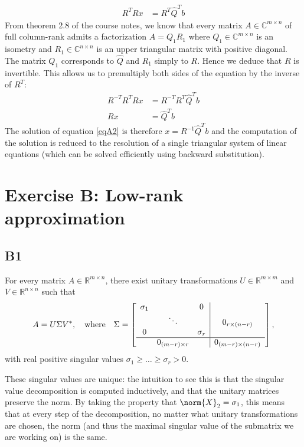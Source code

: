 \documentclass[11pt]{article}
\newcommand{\real}{\mathbb{R}} %
\newcommand{\complex}{\mathbb{C}} %
\newcommand{\snorm}[1]{\norm{#1}_2} %
\begin{document}
\begin{align*}
    R^TRx &= R^T\hat{Q}^Tb
\end{align*}
From theorem 2.8 of the course notes, we know that every matrix $A\in\complex^{m\times n}$ of full column-rank admits a factorization $A=Q_1R_1$ where $Q_1\in\complex^{m\times n}$ is an isometry and $R_1\in\complex^{n\times n}$ is an upper triangular matrix with positive diagonal. The matrix $Q_1$ corresponds to $\hat{Q}$ and $R_1$ simply to $R$. Hence we deduce that $R$ is invertible. This allows us to premultiply both sides of the equation by the inverse of $R^T$:
\begin{align*}
    R^{-T}R^TRx &= R^{-T}R^T\hat{Q}^Tb\\
    Rx &= \hat{Q}^Tb
\end{align*}
The solution of equation \eqref{eqA2} is therefore $x=R^{-1}\hat{Q}^Tb$ and the computation of the solution is reduced to the resolution of a single triangular system of linear equations (which can be solved efficiently using backward substitution).


\section*{Exercise B: Low-rank approximation}
\subsection*{B1}
For every matrix \(A \in \real^{m \times n}\), there exist unitary transformations \(U \in \real^{m \times m}\) and \(V \in \real^{n \times n}\) such that
\[
A = U \Sigma V^*, \quad \textnormal{where}\quad \Sigma = \left[\begin{array}{ccc|c}
\sigma_1 & & 0 & \\
& \ddots & & 0_{r \times (n-r)}\\
0 && \sigma_r & \\
\hline
& 0_{(m-r) \times r} & & 0_{(m-r) \times (n-r)}
\end{array}\right],
\]
with real positive singular values \(\sigma_1 \geqslant \dots \geqslant \sigma_r > 0\).

These singular values are unique: the intuition to see this is that the singular value decomposition is computed inductively, and that the unitary matrices preserve the norm. By taking the property that \(\snorm{X} = \sigma_1\), this means that at every step of the decomposition, no matter what unitary transformations are chosen, the norm (and thus the maximal singular value of the submatrix we are working on) is the same.
\end{document}
